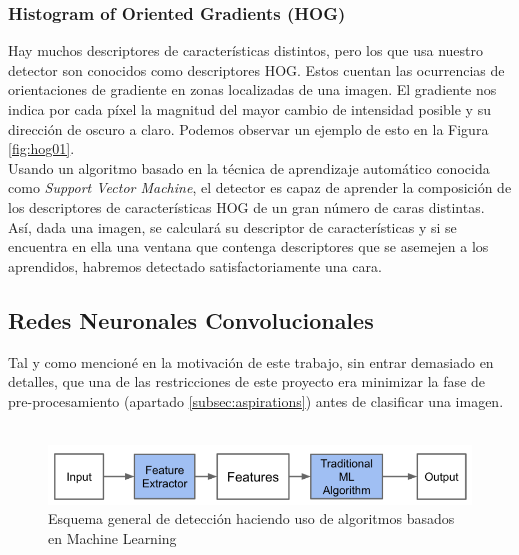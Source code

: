 \documentclass[a4paper,11pt]{book}
\begin{document}
\subsubsection{Histogram of Oriented Gradients (HOG)}
Hay muchos descriptores de características distintos, pero los que usa nuestro detector son conocidos como descriptores HOG. Estos cuentan las ocurrencias de orientaciones de gradiente en zonas localizadas de una imagen. El gradiente nos indica por cada píxel la magnitud del mayor cambio de intensidad posible y su dirección de oscuro a claro. Podemos observar un ejemplo de esto en la Figura \ref{fig:hog01}.\\
Usando un algoritmo\cite{king15} basado en la técnica de aprendizaje automático conocida como \textit{Support Vector Machine}\cite{cortes_vapnik95}, el detector es capaz de aprender la composición de los descriptores de características HOG de un gran número de caras distintas.\\
Así, dada una imagen, se calculará su descriptor de características y si se encuentra en ella una ventana que contenga descriptores que se asemejen a los aprendidos, habremos detectado satisfactoriamente una cara.

\subsection{Redes Neuronales Convolucionales}\label{sub:cnns}
Tal y como mencioné en la motivación de este trabajo, sin entrar demasiado en detalles, que una de las restricciones de este proyecto era minimizar la fase de pre-procesamiento (apartado \ref{subsec:aspirations}) antes de clasificar una imagen.\\ \\
\begin{figure}[h]
\centering
\includegraphics[width=0.7\linewidth]{imagenes/machine_learning_flow}
\caption[Machine Learning]{Esquema general de detección haciendo uso de algoritmos basados en Machine Learning \cite{moujahid16} }
\label{fig:machine_learning_flow}
\end{figure}
\\
\end{document}
